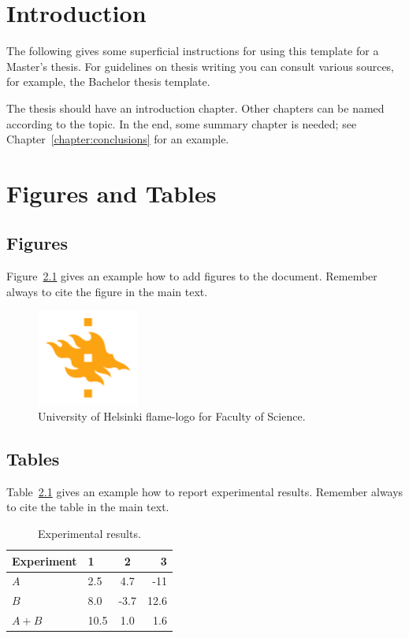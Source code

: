 \chapter{Introduction}

The following gives some superficial instructions for using this template for a Master's thesis. For guidelines on thesis writing you can consult various sources, for example, the Bachelor thesis template.

The thesis should have an introduction chapter. Other chapters can be named according to the topic. In the end, some summary chapter is needed; see Chapter~\ref{chapter:conclusions} for an example.

\chapter{Figures and Tables}

\section{Figures}
Figure~\ref{fig:logo} gives an example how to add figures to the document. Remember always to cite the figure in the main text.

\begin{figure}[h!] 
\centering 
\includegraphics[width=0.3\textwidth]{HY-logo-ml.png}
\caption{University of Helsinki flame-logo for Faculty of Science.\label{fig:logo}}
\end{figure}

\section{Tables}

Table~\ref{table:results} gives an example how to report experimental results. Remember always to cite the table in the main text. 

\begin{table}
\centering
\caption{Experimental results.\label{table:results}}
\begin{tabular}{l||l c r} 
Experiment & 1 & 2 & 3 \\ 
\hline \hline 
$A$ & 2.5 & 4.7 & -11 \\
$B$ & 8.0 & -3.7 & 12.6 \\
$A+B$ & 10.5 & 1.0 & 1.6 \\
\hline
%
\end{tabular}
\end{table}

